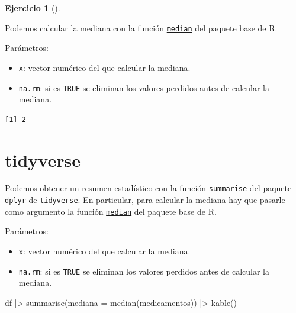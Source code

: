 \documentclass[
  spanish,
  a4paper,
]{scrreport}
\newenvironment{Shaded}{\begin{snugshade}}{\end{snugshade}}
\newcommand{\AttributeTok}[1]{\textcolor[rgb]{0.40,0.45,0.13}{#1}}
\newcommand{\FunctionTok}[1]{\textcolor[rgb]{0.28,0.35,0.67}{#1}}
\newcommand{\NormalTok}[1]{\textcolor[rgb]{0.00,0.23,0.31}{#1}}
\newcommand{\SpecialCharTok}[1]{\textcolor[rgb]{0.37,0.37,0.37}{#1}}
\providecommand{\tightlist}{%
  \setlength{\itemsep}{0pt}\setlength{\parskip}{0pt}}
\theoremstyle{definition}
\newtheorem{exercise}{Ejercicio}[chapter]
\theoremstyle{remark}
\begin{document}
\begin{exercise}[]
\begin{enumerate}
\begin{tcolorbox}
  Podemos calcular la mediana con la función
  \href{https://www.rdocumentation.org/packages/base/versions/3.6.2/topics/median}{\texttt{median}}
  del paquete base de R.

  Parámetros:

  \begin{itemize}
  \tightlist
  \item
    \texttt{x}: vector numérico del que calcular la mediana.
  \item
    \texttt{na.rm}: si es \texttt{TRUE} se eliminan los valores perdidos
    antes de calcular la mediana.
  \end{itemize}

\begin{Shaded}
\end{Shaded}

\begin{verbatim}
[1] 2
\end{verbatim}

  \section{tidyverse}

  Podemos obtener un resumen estadístico con la función
  \href{https://dplyr.tidyverse.org/reference/summarise.html}{\texttt{summarise}}
  del paquete \texttt{dplyr} de \texttt{tidyverse}. En particular, para
  calcular la mediana hay que pasarle como argumento la función
  \href{https://www.rdocumentation.org/packages/base/versions/3.6.2/topics/median}{\texttt{median}}
  del paquete base de R.

  Parámetros:

  \begin{itemize}
  \tightlist
  \item
    \texttt{x}: vector numérico del que calcular la mediana.
  \item
    \texttt{na.rm}: si es \texttt{TRUE} se eliminan los valores perdidos
    antes de calcular la mediana.
  \end{itemize}

\begin{Shaded}
\begin{Highlighting}[]
\NormalTok{df }\SpecialCharTok{|\textgreater{}} \FunctionTok{summarise}\NormalTok{(}\AttributeTok{mediana =} \FunctionTok{median}\NormalTok{(medicamentos)) }\SpecialCharTok{|\textgreater{}}
    \FunctionTok{kable}\NormalTok{()}
\end{Highlighting}
\end{Shaded}


\end{tcolorbox}
\end{enumerate}
\end{exercise}
\end{document}
